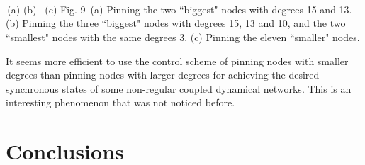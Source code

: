 \documentclass[11pt]{article}
\begin{document}
\vskip-0.6cm \qquad\qquad\qquad\qquad{}
\vskip0.1cm 
\begin{center}
\quad \unitlength=1cm \hbox{\hspace*{0.1cm} 
 }
\end{center}
\vskip0.1cm 
\begin{center}
\quad \unitlength=1cm \hbox{\hspace*{0.1cm} 
 \quad {}
 }
\end{center}
\vskip-0.6cm \qquad\qquad\quad\; \vskip0.1cm 
\begin{center}
\unitlength=1cm \hbox{\hspace*{0.1cm} 
 
 
 }
\end{center}
\vskip-1cm {\small \qquad\;\,(a) 
\qquad\quad (b)  \qquad\quad\, (c)
} \vskip0.1cm {\small\qquad  Fig. 9
\,(a) Pinning the two ``biggest" nodes with degrees 15 and 13. (b)
Pinning the three ``biggest" nodes with degrees 15, 13 and 10, and
the two ``smallest" nodes with the same degrees 3. (c) Pinning the
eleven ``smaller" nodes.}

It seems more efficient to use the control scheme of pinning nodes
with smaller degrees than pinning nodes with larger degrees for
achieving the desired synchronous states of some non-regular coupled
dynamical networks. This is an interesting phenomenon that was not
noticed before.

\section{Conclusions}
\end{document}
